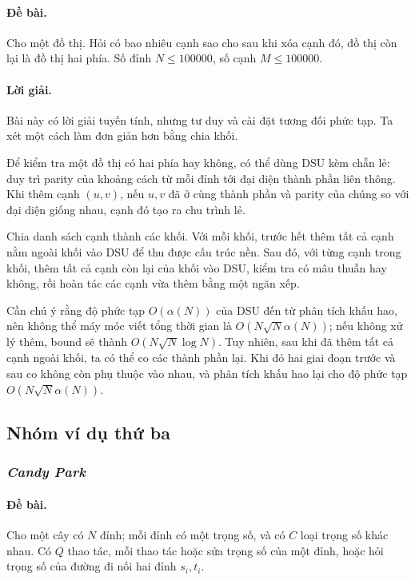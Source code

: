\documentclass[11pt]{article}
\begin{document}
\paragraph{Đề bài.}
Cho một đồ thị. Hỏi có bao nhiêu cạnh sao cho sau khi xóa cạnh đó, đồ thị còn
lại là đồ thị hai phía. Số đỉnh \(N\le 100000\), số cạnh \(M\le 100000\).

\paragraph{Lời giải.}
Bài này có lời giải tuyến tính, nhưng tư duy và cài đặt tương đối phức tạp.
Ta xét một cách làm đơn giản hơn bằng chia khối.

Để kiểm tra một đồ thị có hai phía hay không, có thể dùng DSU kèm chẵn lẻ:
duy trì parity của khoảng cách từ mỗi đỉnh tới đại diện thành phần liên thông.
Khi thêm cạnh \((u,v)\), nếu \(u,v\) đã ở cùng thành phần và parity của chúng
so với đại diện giống nhau, cạnh đó tạo ra chu trình lẻ.

Chia danh sách cạnh thành các khối. Với mỗi khối, trước hết thêm tất cả cạnh
nằm ngoài khối vào DSU để thu được cấu trúc nền. Sau đó, với từng cạnh trong
khối, thêm tất cả cạnh còn lại của khối vào DSU, kiểm tra có mâu thuẫn hay
không, rồi hoàn tác các cạnh vừa thêm bằng một ngăn xếp.

Cần chú ý rằng độ phức tạp \(O(\alpha(N))\) của DSU đến từ phân tích khấu hao,
nên không thể máy móc viết tổng thời gian là \(O(N\sqrt N\alpha(N))\); nếu
không xử lý thêm, bound sẽ thành \(O(N\sqrt N\log N)\). Tuy nhiên, sau khi đã
thêm tất cả cạnh ngoài khối, ta có thể co các thành phần lại. Khi đó hai giai
đoạn trước và sau co không còn phụ thuộc vào nhau, và phân tích khấu hao lại
cho độ phức tạp \(O(N\sqrt N\alpha(N))\).

\subsection{Nhóm ví dụ thứ ba}

\subsubsection{\emph{Candy Park}}

\paragraph{Đề bài.}
Cho một cây có \(N\) đỉnh; mỗi đỉnh có một trọng số, và có \(C\) loại trọng số
khác nhau. Có \(Q\) thao tác, mỗi thao tác hoặc sửa trọng số của một đỉnh,
hoặc hỏi trọng số của đường đi nối hai đỉnh \(s_i,t_i\).
\end{document}
